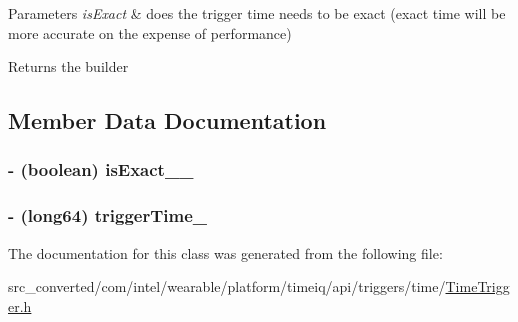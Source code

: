 \begin{DoxyParams}{Parameters}
{\em is\+Exact} & does the trigger time needs to be exact (exact time will be more accurate on the expense of performance) \\
\hline
\end{DoxyParams}
\begin{DoxyReturn}{Returns}
the builder 
\end{DoxyReturn}


\subsection{Member Data Documentation}
\hypertarget{interface_time_trigger___time_trigger_builder_a352cd5a056b8b1fb883eb1e71cc5a5b6}{}
\subsubsection[{is\+Exact\+\_\+\+\_\+}]{\setlength{\rightskip}{0pt plus 5cm}-\/ (boolean) is\+Exact\+\_\+\+\_\+}\label{interface_time_trigger___time_trigger_builder_a352cd5a056b8b1fb883eb1e71cc5a5b6}
\hypertarget{interface_time_trigger___time_trigger_builder_af32978d17fc03fb098161b3a9846faa4}{}
\subsubsection[{trigger\+Time\+\_\+}]{\setlength{\rightskip}{0pt plus 5cm}-\/ (long64) trigger\+Time\+\_\+}\label{interface_time_trigger___time_trigger_builder_af32978d17fc03fb098161b3a9846faa4}


The documentation for this class was generated from the following file\+:\begin{DoxyCompactItemize}
\item 
src\+\_\+converted/com/intel/wearable/platform/timeiq/api/triggers/time/\hyperlink{_time_trigger_8h}{Time\+Trigger.\+h}\end{DoxyCompactItemize}
